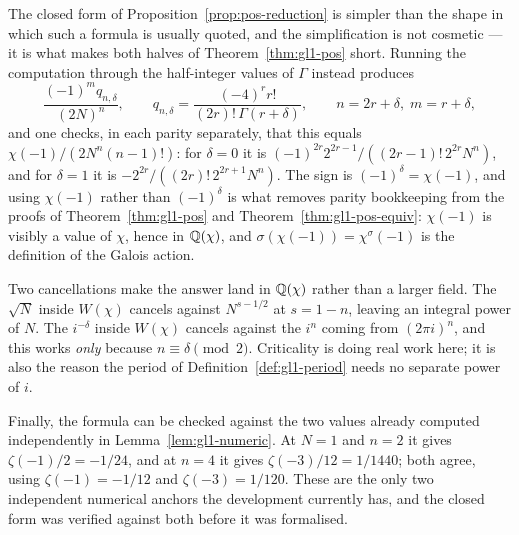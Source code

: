 \begin{remark}
  \label{rem:pos-cancellations}
  The closed form of Proposition~\ref{prop:pos-reduction} is simpler than the shape in which
  such a formula is usually quoted, and the simplification is not cosmetic --- it is what
  makes both halves of Theorem~\ref{thm:gl1-pos} short. Running the computation through the
  half-integer values of $\Gamma$ instead produces
  \[ \frac{(-1)^{m} q_{n,\delta}}{(2N)^{n}}, \qquad
     q_{n,\delta} = \frac{(-4)^{r} r!}{(2r)!\,\Gamma(r+\delta)}, \qquad n = 2r+\delta, \;
     m = r+\delta, \]
  and one checks, in each parity separately, that this equals
  $\chi(-1)/(2N^{n}(n-1)!)$: for $\delta = 0$ it is
  $(-1)^{2r} 2^{2r-1}/((2r-1)!\,2^{2r}N^{n})$, and for $\delta = 1$ it is
  $-2^{2r}/((2r)!\,2^{2r+1}N^{n})$. The sign is $(-1)^{\delta} = \chi(-1)$, and using
  $\chi(-1)$ rather than $(-1)^{\delta}$ is what removes parity bookkeeping from the proofs
  of Theorem~\ref{thm:gl1-pos} and Theorem~\ref{thm:gl1-pos-equiv}: $\chi(-1)$ is visibly a
  value of $\chi$, hence in $\mathbb{Q}(\chi)$, and $\sigma(\chi(-1)) = \chi^{\sigma}(-1)$ is the
  definition of the Galois action.

  Two cancellations make the answer land in $\mathbb{Q}(\chi)$ rather than a larger field. The
  $\sqrt{N}$ inside $W(\chi)$ cancels against $N^{s-1/2}$ at $s = 1-n$, leaving an integral
  power of $N$. The $i^{-\delta}$ inside $W(\chi)$ cancels against the $i^{n}$ coming from
  $(2\pi i)^{n}$, and this works \emph{only} because $n \equiv \delta \pmod 2$. Criticality is
  doing real work here; it is also the reason the period of Definition~\ref{def:gl1-period}
  needs no separate power of $i$.

  Finally, the formula can be checked against the two values already computed independently
  in Lemma~\ref{lem:gl1-numeric}. At $N = 1$ and $n = 2$ it gives
  $\zeta(-1)/2 = -1/24$, and at $n = 4$ it gives $\zeta(-3)/12 = 1/1440$; both agree, using
  $\zeta(-1) = -1/12$ and $\zeta(-3) = 1/120$. These are the only two independent numerical
  anchors the development currently has, and the closed form was verified against both before
  it was formalised.
\end{remark}

